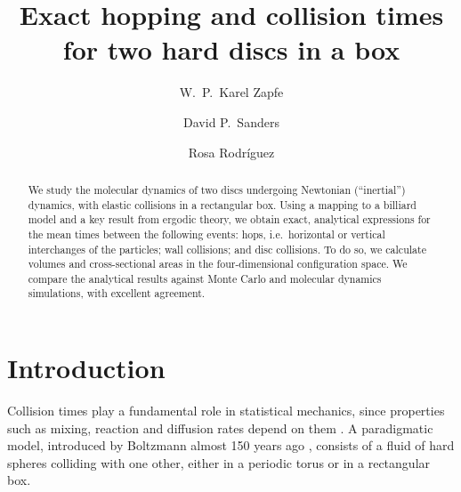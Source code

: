 \documentclass[superscriptaddress,pre,reprint,showpacs,twocolumn]{revtex4-1}
\begin{document}
\title{Exact hopping and collision times for two hard discs in a box}

\author{W.~P.~Karel Zapfe}


\author{David P.~Sanders}



\author{Rosa Rodríguez}



\begin{abstract}
We study the molecular dynamics of two discs undergoing Newtonian (``inertial'') dynamics, with elastic collisions in a rectangular box.
Using a mapping to a billiard model and a key result from ergodic theory, we obtain exact, analytical expressions for the mean times between the following events:
hops, i.e.~horizontal or vertical interchanges of the particles; wall collisions; and disc collisions.
To do so, we calculate
volumes and cross-sectional areas in the four-dimensional configuration space.
We compare the analytical results against Monte Carlo and molecular dynamics simulations, with excellent agreement.
\end{abstract}

\maketitle



\section{Introduction}


Collision times play a fundamental role in statistical mechanics, since properties
such as mixing, reaction and diffusion rates depend on them \cite{Boltz72, Tolman, VanKampen}.
A paradigmatic model, introduced by Boltzmann almost 150 years ago \cite{Boltz72, SzaszBook00},
consists of a fluid of hard spheres colliding with one other, either in a periodic torus or in
a rectangular box.
\end{document}
